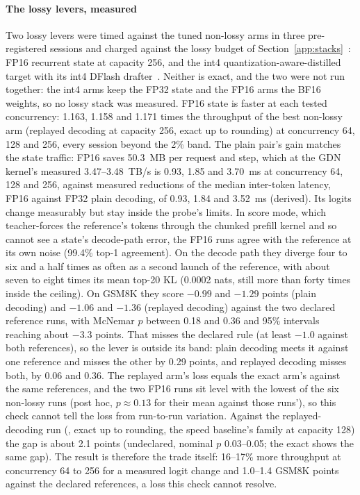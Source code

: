 \paragraph{The lossy levers, measured} Two lossy levers were timed against the tuned non-lossy arms in three pre-registered sessions and charged against the lossy budget of Section~\ref{app:stacks}~: FP16 recurrent state at capacity 256, and the int4 quantization-aware-distilled target with its int4 DFlash drafter~\cite{nota2026}. Neither is exact, and the two were not run together: the int4 arms keep the FP32 state and the FP16 arms the BF16 weights, so no lossy stack was measured. FP16 state is faster at each tested concurrency: 1.163, 1.158 and 1.171 times the throughput of the best non-lossy arm (replayed decoding at capacity 256, exact up to rounding) at concurrency 64, 128 and 256, every session beyond the 2\% band. The plain pair's gain matches the state traffic: FP16 saves 50.3~MB per request and step, which at the GDN kernel's measured 3.47--3.48~TB/s is 0.93, 1.85 and 3.70~ms at concurrency 64, 128 and 256, against measured reductions of the median inter-token latency, FP16 against FP32 plain decoding, of 0.93, 1.84 and 3.52~ms (derived). Its logits change measurably but stay inside the probe's limits. In score mode, which teacher-forces the reference's tokens through the chunked prefill kernel and so cannot see a state's decode-path error, the FP16 runs agree with the reference at its own noise (99.4\% top-1 agreement). On the decode path they diverge four to six and a half times as often as a second launch of the reference, with about seven to eight times its mean top-20 KL (0.0002 nats, still more than forty times inside the ceiling). On GSM8K they score $-0.99$ and $-1.29$ points (plain decoding) and $-1.06$ and $-1.36$ (replayed decoding) against the two declared reference runs, with McNemar $p$ between 0.18 and 0.36 and 95\% intervals reaching about $-3.3$ points. That misses the declared rule (at least $-1.0$ against both references), so the lever is outside its band: plain decoding meets it against one reference and misses the other by 0.29 points, and replayed decoding misses both, by 0.06 and 0.36. The replayed arm's loss equals the exact  arm's against the same references, and the two FP16 runs sit level with the lowest of the six non-lossy runs (post hoc, $p\approx0.13$ for their mean against those runs'), so this check cannot tell the loss from run-to-run variation. Against the replayed-decoding run (, exact up to rounding, the speed baseline's family at capacity 128) the gap is about 2.1 points (undeclared, nominal $p$ 0.03--0.05; the exact  shows the same gap). The result is therefore the trade itself: 16--17\% more throughput at concurrency 64 to 256 for a measured logit change and 1.0--1.4 GSM8K points against the declared references, a loss this check cannot resolve.

